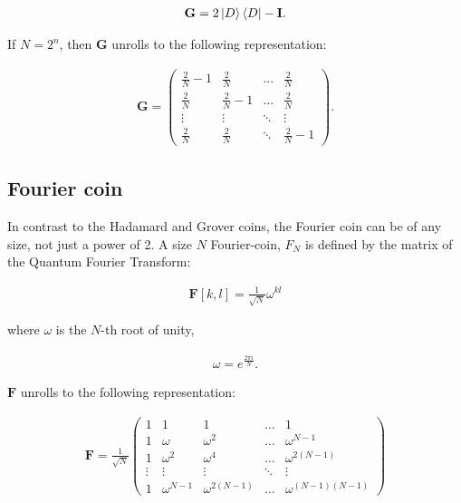 \begin{align*}
    \mathbf{G} = 2\ket{D}\bra{D} - \mathbf{I}.
\end{align*}

If $N = 2^n$, then $\mathbf{G}$ unrolls to the following representation:

\begin{align*}
  \mathbf{G} = \begin{pmatrix}
      \frac{2}{N} - 1 & \frac{2}{N} & \dots  & \frac{2}{N} \\
      \frac{2}{N} & \frac{2}{N} - 1 & \dots  & \frac{2}{N} \\
      \vdots & \vdots & \ddots & \vdots \\
      \frac{2}{N} & \frac{2}{N} & \ddots & \frac{2}{N} - 1
    \end{pmatrix}.
\end{align*}

\subsection{Fourier coin}

In contrast to the Hadamard and Grover coins, the Fourier coin can be of any size, not just a power of 2. A size $N$ Fourier-coin, $F_N$ is defined by the matrix of the Quantum Fourier Transform:

\begin{align*}
\mathbf{F}[k,l] = \frac{1}{\sqrt{N}} \omega^{kl}
\end{align*}

where $\omega$ is the $N$-th root of unity,

\begin{align*}
\omega = e^{\frac{2\pi{}i}{N}}.
\end{align*}

$\mathbf{F}$ unrolls to the following representation:

\begin{align*}
\mathbf{F} = \frac{1}{\sqrt{N}}
\begin{pmatrix}
  1 & 1 & 1 & \dots & 1 \\
  1 & \omega & \omega^2 & \dots & \omega^{N-1} \\
  1 & \omega^2 & \omega^4 & \dots & \omega^{2(N-1)} \\
  \vdots & \vdots & \vdots & \ddots & \vdots \\
  1 & \omega^{N-1} & \omega^{2(N-1)} & \dots & \omega^{(N-1)(N-1)}
\end{pmatrix}
\end{align*}

